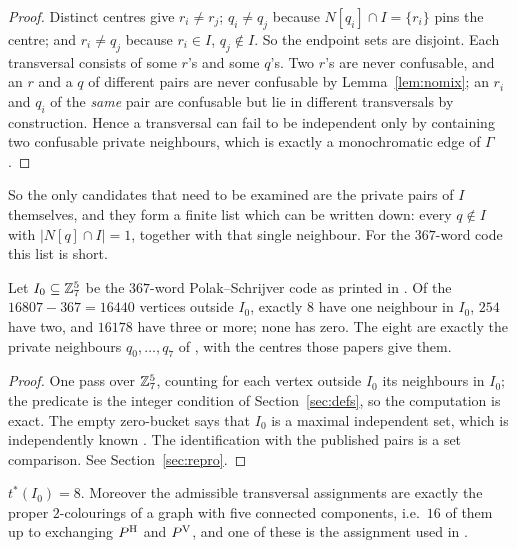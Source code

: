 \begin{proof}
Distinct centres give $r_i\neq r_j$; $q_i\neq q_j$ because $N[q_i]\cap I=\{r_i\}$ pins the
centre; and $r_i\neq q_j$ because $r_i\in I$, $q_j\notin I$. So the endpoint sets are
disjoint. Each transversal consists of some $r$'s and some $q$'s. Two $r$'s are never
confusable, and an $r$ and a $q$ of different pairs are never confusable by
Lemma~\ref{lem:nomix}; an $r_i$ and $q_i$ of the \emph{same} pair are confusable but lie in
different transversals by construction. Hence a transversal can fail to be independent only
by containing two confusable private neighbours, which is exactly a monochromatic edge of
$\Gamma$.
\end{proof}

So the only candidates that need to be examined are the private pairs of $I$ themselves, and
they form a finite list which can be written down: every $q\notin I$ with $|N[q]\cap I|=1$,
together with that single neighbour. For the $367$-word code this list is short.

\begin{proposition}
\label{prop:count}
Let $I_0\subseteq\mathbb{Z}_7^5$ be the $367$-word Polak--Schrijver code as printed in \cite{polak2019}.
Of the $16807-367=16440$ vertices outside $I_0$, exactly $8$ have one neighbour in $I_0$,
$254$ have two, and $16178$ have three or more; none has zero. The eight are exactly the
private neighbours $q_0,\dots,q_7$ of \cite{itty2026,gao2026}, with the centres those papers
give them.
\end{proposition}

\begin{proof}
One pass over $\mathbb{Z}_7^5$, counting for each vertex outside $I_0$ its neighbours in $I_0$; the
predicate is the integer condition of Section~\ref{sec:defs}, so the computation is exact.
The empty zero-bucket says that $I_0$ is a maximal independent set, which is independently
known \cite[Appendix]{polak2019}. The identification with the published pairs is a set
comparison. See Section~\ref{sec:repro}.
\end{proof}

\begin{theorem}
\label{thm:main}
$t^*(I_0)=8$. Moreover the admissible transversal assignments are exactly the proper
$2$-colourings of a graph with five connected components, i.e.\ $16$ of them up to exchanging
$P^{\mathrm H}$ and $P^{\mathrm V}$, and one of these is the assignment used in \cite{itty2026,gao2026,bpz2026,tandon2026}.
\end{theorem}


